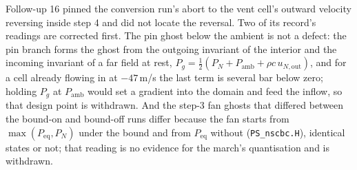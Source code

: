 \documentclass[11pt,a4paper]{article}
\newcommand{\code}[1]{\texttt{\small #1}}
\begin{document}
Follow-up 16 pinned the conversion run's abort to the vent cell's
outward velocity reversing inside step 4 and did not locate the
reversal.  Two of its record's readings are corrected first.  The pin
ghost below the ambient is not a defect: the pin branch forms the ghost
from the outgoing invariant of the interior and the incoming invariant
of a far field at rest, $P_g = \tfrac12 (P_N + P_{\mathrm{amb}} + \rho c\, u_{N,\mathrm{out}})$,
and for a cell already flowing in at $-47$\,m/s the last term is
several bar below zero; holding $P_g$ at $P_{\mathrm{amb}}$ would set a
gradient into the domain and feed the inflow, so that design point is
withdrawn.  And the step-3 fan ghosts that differed between the
bound-on and bound-off runs differ because the fan starts from
$\max(P_{\mathrm{eq}}, P_N)$ under the bound and from $P_{\mathrm{eq}}$
without (\code{PS\_nscbc.H}), identical states or not; that reading is
no evidence for the march's quantisation and is withdrawn.
\end{document}
